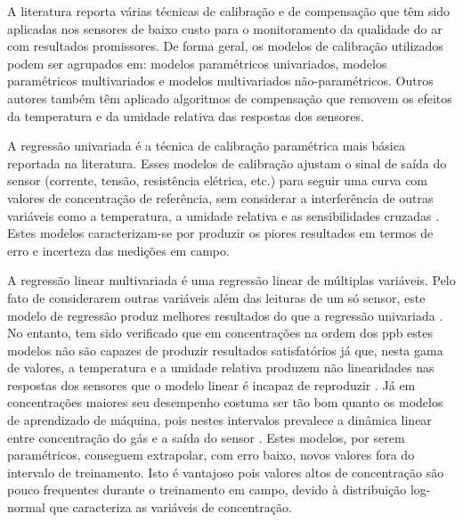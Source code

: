 A literatura reporta várias técnicas de calibração e de compensação que têm sido aplicadas nos sensores de baixo custo para o monitoramento da qualidade do ar com resultados promissores. De forma geral, os modelos de calibração utilizados podem ser agrupados em: modelos paramétricos univariados, modelos paramétricos multivariados e modelos multivariados não-paramétricos. Outros autores também têm aplicado algoritmos de compensação que removem os efeitos da temperatura e da umidade relativa das respostas dos sensores. 

A regressão univariada é a técnica de calibração paramétrica mais básica reportada na literatura. Esses modelos de calibração ajustam o sinal de saída do sensor (corrente, tensão, resistência elétrica, etc.) para seguir uma curva com valores de concentração de referência, sem considerar a interferência de outras variáveis como a temperatura, a umidade relativa e as sensibilidades cruzadas \cite{Maag2018ADeployments}. Estes modelos caracterizam-se por produzir os piores resultados em termos de erro e incerteza das medições em campo.

A regressão linear multivariada é uma regressão linear de múltiplas variáveis. Pelo fato de considerarem outras variáveis além das leituras de um só sensor, este modelo de regressão produz melhores resultados do que a regressão univariada \cite{Karagulian2019ReviewMonitoring}. No entanto, tem sido verificado que em concentrações na ordem dos \gls{ppb} estes modelos não são capazes de produzir resultados satisfatórios já que, nesta gama de valores, a temperatura e a umidade relativa produzem não linearidades nas respostas dos sensores que o modelo linear é incapaz de reproduzir \cite{Hagan2018CalibrationInstruments}. Já em concentrações maiores seu desempenho costuma ser tão bom quanto os modelos de aprendizado de máquina, pois nestes intervalos prevalece a dinâmica linear entre concentração do gás e a saída do sensor \cite{Hagan2018CalibrationInstruments}. Estes modelos, por serem paramétricos, conseguem extrapolar, com erro baixo, novos valores fora do intervalo de treinamento. Isto é vantajoso pois valores altos de concentração são pouco frequentes durante o treinamento em campo, devido à distribuição log-normal que caracteriza as variáveis de concentração.


